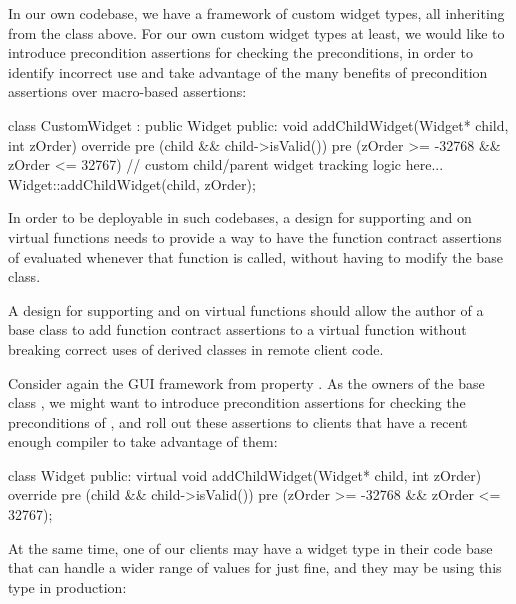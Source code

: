 In our own codebase, we have a framework of custom widget types, all inheriting from the  class above. For our own custom widget types at least, we would like to introduce precondition assertions for checking the preconditions, in order to identify incorrect use and take advantage of the many benefits of precondition assertions over macro-based assertions:
\begin{codeblock}
class CustomWidget : public Widget {
public:
  void addChildWidget(Widget* child, int zOrder) override
    pre (child && child->isValid())
    pre (zOrder >= -32768 && zOrder <= 32767) 
  {
    // custom child/parent widget tracking logic here...
    Widget::addChildWidget(child, zOrder);
  }
}
\end{codeblock}
In order to be deployable in such codebases, a design for supporting  and  on virtual functions needs to provide a way to have the function contract assertions of \allowbreak{} evaluated whenever that function is called, without having to modify the   base class.


A design for supporting  and  on virtual functions should allow the author of a base class to add function contract assertions to a virtual function without breaking correct uses of derived classes in remote client code.

Consider again the GUI framework from property . As the owners of the base class , we might want to introduce precondition assertions for checking the preconditions of \allowbreak{}, and roll out these assertions to clients that have a recent enough compiler to take advantage of them: 

\begin{codeblock}
class Widget {
public:
  virtual void addChildWidget(Widget* child, int zOrder) override
    pre (child && child->isValid())
    pre (zOrder >= -32768 && zOrder <= 32767);
}
\end{codeblock}

At the same time, one of our clients may have a widget type in their code base that can handle a wider range of values for  just fine, and they may be using this type in production:

